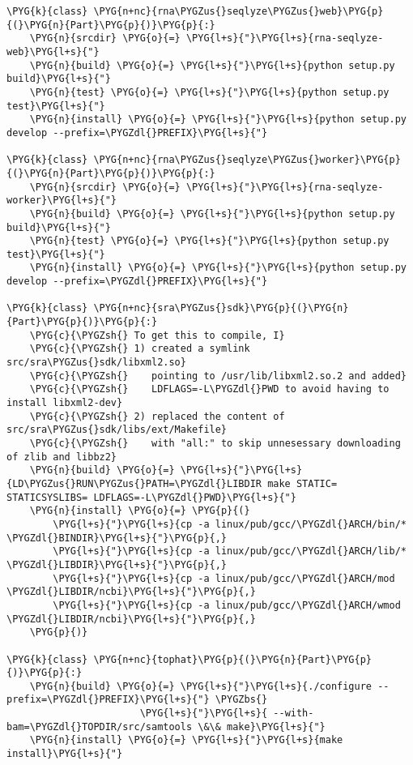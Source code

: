 \begin{Verbatim}[commandchars=\\\{\}]
\PYG{k}{class} \PYG{n+nc}{rna\PYGZus{}seqlyze\PYGZus{}web}\PYG{p}{(}\PYG{n}{Part}\PYG{p}{)}\PYG{p}{:}
    \PYG{n}{srcdir} \PYG{o}{=} \PYG{l+s}{"}\PYG{l+s}{rna-seqlyze-web}\PYG{l+s}{"}
    \PYG{n}{build} \PYG{o}{=} \PYG{l+s}{"}\PYG{l+s}{python setup.py build}\PYG{l+s}{"}
    \PYG{n}{test} \PYG{o}{=} \PYG{l+s}{"}\PYG{l+s}{python setup.py test}\PYG{l+s}{"}
    \PYG{n}{install} \PYG{o}{=} \PYG{l+s}{"}\PYG{l+s}{python setup.py develop --prefix=\PYGZdl{}PREFIX}\PYG{l+s}{"}

\PYG{k}{class} \PYG{n+nc}{rna\PYGZus{}seqlyze\PYGZus{}worker}\PYG{p}{(}\PYG{n}{Part}\PYG{p}{)}\PYG{p}{:}
    \PYG{n}{srcdir} \PYG{o}{=} \PYG{l+s}{"}\PYG{l+s}{rna-seqlyze-worker}\PYG{l+s}{"}
    \PYG{n}{build} \PYG{o}{=} \PYG{l+s}{"}\PYG{l+s}{python setup.py build}\PYG{l+s}{"}
    \PYG{n}{test} \PYG{o}{=} \PYG{l+s}{"}\PYG{l+s}{python setup.py test}\PYG{l+s}{"}
    \PYG{n}{install} \PYG{o}{=} \PYG{l+s}{"}\PYG{l+s}{python setup.py develop --prefix=\PYGZdl{}PREFIX}\PYG{l+s}{"}

\PYG{k}{class} \PYG{n+nc}{sra\PYGZus{}sdk}\PYG{p}{(}\PYG{n}{Part}\PYG{p}{)}\PYG{p}{:}
    \PYG{c}{\PYGZsh{} To get this to compile, I}
    \PYG{c}{\PYGZsh{} 1) created a symlink src/sra\PYGZus{}sdk/libxml2.so}
    \PYG{c}{\PYGZsh{}    pointing to /usr/lib/libxml2.so.2 and added}
    \PYG{c}{\PYGZsh{}    LDFLAGS=-L\PYGZdl{}PWD to avoid having to install libxml2-dev}
    \PYG{c}{\PYGZsh{} 2) replaced the content of src/sra\PYGZus{}sdk/libs/ext/Makefile}
    \PYG{c}{\PYGZsh{}    with "all:" to skip unnesessary downloading of zlib and libbz2}
    \PYG{n}{build} \PYG{o}{=} \PYG{l+s}{"}\PYG{l+s}{LD\PYGZus{}RUN\PYGZus{}PATH=\PYGZdl{}LIBDIR make STATIC= STATICSYSLIBS= LDFLAGS=-L\PYGZdl{}PWD}\PYG{l+s}{"}
    \PYG{n}{install} \PYG{o}{=} \PYG{p}{(}
        \PYG{l+s}{"}\PYG{l+s}{cp -a linux/pub/gcc/\PYGZdl{}ARCH/bin/* \PYGZdl{}BINDIR}\PYG{l+s}{"}\PYG{p}{,}
        \PYG{l+s}{"}\PYG{l+s}{cp -a linux/pub/gcc/\PYGZdl{}ARCH/lib/* \PYGZdl{}LIBDIR}\PYG{l+s}{"}\PYG{p}{,}
        \PYG{l+s}{"}\PYG{l+s}{cp -a linux/pub/gcc/\PYGZdl{}ARCH/mod \PYGZdl{}LIBDIR/ncbi}\PYG{l+s}{"}\PYG{p}{,}
        \PYG{l+s}{"}\PYG{l+s}{cp -a linux/pub/gcc/\PYGZdl{}ARCH/wmod \PYGZdl{}LIBDIR/ncbi}\PYG{l+s}{"}\PYG{p}{,}
    \PYG{p}{)}

\PYG{k}{class} \PYG{n+nc}{tophat}\PYG{p}{(}\PYG{n}{Part}\PYG{p}{)}\PYG{p}{:}
    \PYG{n}{build} \PYG{o}{=} \PYG{l+s}{"}\PYG{l+s}{./configure --prefix=\PYGZdl{}PREFIX}\PYG{l+s}{"} \PYGZbs{}
                       \PYG{l+s}{"}\PYG{l+s}{ --with-bam=\PYGZdl{}TOPDIR/src/samtools \&\& make}\PYG{l+s}{"}
    \PYG{n}{install} \PYG{o}{=} \PYG{l+s}{"}\PYG{l+s}{make install}\PYG{l+s}{"}


\end{Verbatim}
